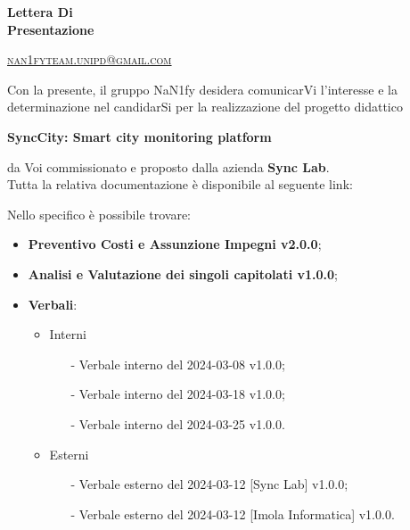 \documentclass[8pt]{article}
\begin{document}
\begin{titlepage}
\begin{minipage}[t]{0.47\textwidth}
{		}
		\vspace{4mm}\vspace{4mm}
	\end{minipage}
	\vspace{4cm}
	\begin{center}
		\begin{flushright}
			{\fontsize{30pt}{52pt}\selectfont \textbf{Lettera Di \\Presentazione\\}} %
		\end{flushright}
		\vspace{3cm}
	\end{center}
	\vspace{8.5 cm}
	{\small \textsc{\href{mailto: nan1fyteam.unipd@gmail.com}{nan1fyteam.unipd@gmail.com}}}
\end{titlepage}
\pagestyle{mystyle}
\newpage
Con la presente, il gruppo NaN1fy desidera comunicarVi l'interesse e la determinazione nel candidarSi per la realizzazione del progetto didattico \\
\begin{center}
	\textbf{SyncCity: Smart city monitoring platform}
\end{center}
da Voi commissionato e proposto dalla azienda \textbf{Sync Lab}.
\vspace{1em}
\\Tutta la relativa documentazione è disponibile al seguente link: 
\begin{center}
	\textbf{\href{https://github.com/NaN1fy/docs/tree/main/documents/candidatura}{\color{myblue}{https://github.com/NaN1fy/docs/tree/main/documents/candidatura}}}
\end{center}
Nello specifico è possibile trovare:
\begin{itemize}
	\item \textbf{Preventivo Costi e Assunzione Impegni v2.0.0};
	\item \textbf{Analisi e Valutazione dei singoli capitolati v1.0.0};
	\item \textbf{Verbali}: 
	\begin{itemize}
		\item Interni 
		\begin{itemize}
			\item[-] Verbale interno del 2024-03-08 v1.0.0;
			\item[-] Verbale interno del 2024-03-18 v1.0.0;
			\item[-] Verbale interno del 2024-03-25 v1.0.0.
		\end{itemize}
		\item Esterni
		\begin{itemize}
			\item[-] Verbale esterno del 2024-03-12 [Sync Lab] v1.0.0;
			\item[-] Verbale esterno del 2024-03-12 [Imola Informatica] v1.0.0.
		\end{itemize}
	\end{itemize}
\end{itemize}
\end{document}
